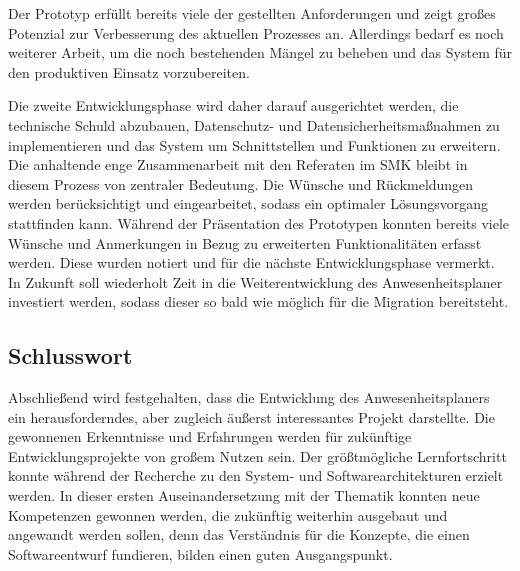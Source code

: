 Der Prototyp erfüllt bereits viele der gestellten Anforderungen und zeigt großes Potenzial zur Verbesserung des aktuellen Prozesses an. Allerdings bedarf es noch weiterer Arbeit, um die noch bestehenden Mängel zu beheben und das System für den produktiven Einsatz vorzubereiten.

Die zweite Entwicklungsphase wird daher darauf ausgerichtet werden, die technische Schuld abzubauen, Datenschutz- und Datensicherheitsmaßnahmen zu implementieren und das System um Schnittstellen und Funktionen zu erweitern. Die anhaltende enge Zusammenarbeit mit den Referaten im SMK bleibt in diesem Prozess von zentraler Bedeutung. Die Wünsche und Rückmeldungen werden berücksichtigt und eingearbeitet, sodass ein optimaler Lösungsvorgang stattfinden kann. Während der Präsentation des Prototypen konnten bereits viele Wünsche und Anmerkungen in Bezug zu erweiterten Funktionalitäten erfasst werden. Diese wurden notiert und für die nächste Entwicklungsphase vermerkt. In Zukunft soll wiederholt Zeit in die Weiterentwicklung des Anwesenheitsplaner investiert werden, sodass dieser so bald wie möglich für die Migration bereitsteht.

\subsection{Schlusswort}
\label{sec:Abschluss}

Abschließend wird festgehalten, dass die Entwicklung des Anwesenheitsplaners ein herausforderndes, aber zugleich äußerst interessantes Projekt darstellte. Die gewonnenen Erkenntnisse und Erfahrungen werden für zukünftige Entwicklungsprojekte von großem Nutzen sein. Der größtmögliche Lernfortschritt konnte während der Recherche zu den System- und Softwarearchitekturen erzielt werden. In dieser ersten Auseinandersetzung mit der Thematik konnten neue Kompetenzen gewonnen werden, die zukünftig weiterhin ausgebaut und angewandt werden sollen, denn das Verständnis für die Konzepte, die einen Softwareentwurf fundieren, bilden einen guten Ausgangspunkt.
